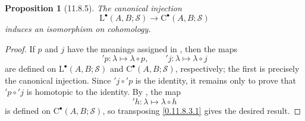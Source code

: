 \documentclass[oneside]{amsart}
\theoremstyle{ega-env-style}
\theoremstyle{ega-thm-env-style}
\newtheorem*{proposition}{Proposition}
\theoremstyle{ega-defn-env-style}
\def\mathcal{\mathscr}
\def\sh{\mathcal}                   %
\let\EGAOriginalLabel\label
\renewcommand{\label}[1]{\phantomsection\EGAOriginalLabel{#1}}
\begin{document}
\begin{proposition}[11.8.5]
\label{0.11.8.5}
The canonical injection
\[
  \mathrm{L}^\bullet(A,B;\sh{S})
  \longrightarrow
  \mathrm{C}^\bullet(A,B;\sh{S})
\]
induces an isomorphism on cohomology.
\end{proposition}

\begin{proof}
If $p$ and $j$ have the meanings assigned in , then
the maps
\[
  {}'\!p:\lambda\longmapsto\lambda\circ p,
  \qquad
  {}'\!j:\lambda\longmapsto\lambda\circ j
\]
are defined on $\mathrm{L}^\bullet(A,B;\sh{S})$ and
$\mathrm{C}^\bullet(A,B;\sh{S})$, respectively; the first is precisely
the canonical injection.
Since ${}'\!j\circ{}'\!p$ is the identity, it remains only to prove
that ${}'\!p\circ{}'\!j$ is homotopic to the identity.
By , the map
\[
  {}'\!h:\lambda\longmapsto\lambda\circ h
\]
is defined on $\mathrm{C}^\bullet(A,B;\sh{S})$, so transposing
\eqref{0.11.8.3.1} gives the desired result.
\end{proof}
\end{document}
